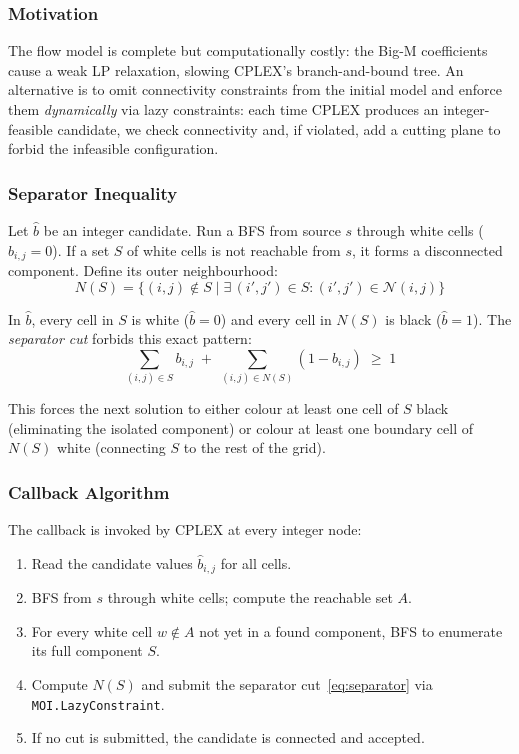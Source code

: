 \subsubsection{Motivation}

The flow model is complete but computationally costly: the Big-M coefficients cause a weak LP relaxation, slowing CPLEX's branch-and-bound tree. An alternative is to omit connectivity constraints from the initial model and enforce them \emph{dynamically} via lazy constraints: each time CPLEX produces an integer-feasible candidate, we check connectivity and, if violated, add a cutting plane to forbid the infeasible configuration.

\subsubsection{Separator Inequality}

Let $\hat{b}$ be an integer candidate. Run a BFS from source $s$ through white cells ($\hat{b}_{i,j} = 0$). If a set $S$ of white cells is not reachable from $s$, it forms a disconnected component. Define its outer neighbourhood:
\[
  N(S) = \bigl\{(i,j) \notin S \;\big|\; \exists\, (i',j') \in S : (i',j') \in \mathcal{N}(i,j) \bigr\}
\]

In $\hat{b}$, every cell in $S$ is white ($\hat{b} = 0$) and every cell in $N(S)$ is black ($\hat{b} = 1$). The \emph{separator cut} forbids this exact pattern:
\begin{equation}
  \sum_{(i,j) \in S} b_{i,j} \;+\; \sum_{(i,j) \in N(S)} (1 - b_{i,j}) \;\geq\; 1
  \label{eq:separator}
\end{equation}

This forces the next solution to either colour at least one cell of $S$ black (eliminating the isolated component) or colour at least one boundary cell of $N(S)$ white (connecting $S$ to the rest of the grid).

\subsubsection{Callback Algorithm}

The callback is invoked by CPLEX at every integer node:

\begin{enumerate}
  \item Read the candidate values $\hat{b}_{i,j}$ for all cells.
  \item BFS from $s$ through white cells; compute the reachable set $A$.
  \item For every white cell $w \notin A$ not yet in a found component, BFS to enumerate its full component $S$.
  \item Compute $N(S)$ and submit the separator cut~\eqref{eq:separator} via \texttt{MOI.LazyConstraint}.
  \item If no cut is submitted, the candidate is connected and accepted.
\end{enumerate}

